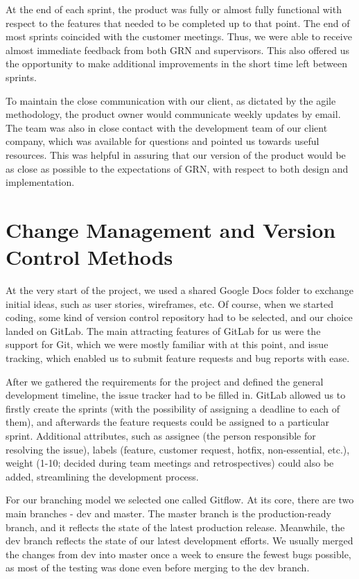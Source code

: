 \documentclass{l3proj}
\begin{document}
At the end of each sprint, the product was fully or almost fully
 functional with respect to the features that needed to be completed
 up to that point. The end of most sprints coincided with the customer
 meetings. Thus, we were able to receive almost immediate feedback
 from both GRN and supervisors. This also offered us the opportunity
 to make additional improvements in the short time left between sprints.

To maintain the close communication with our client, as dictated by
 the agile methodology, the product owner would communicate weekly
 updates by email. The team was also in close contact with the
 development team of our client company, which was available
 for questions and pointed us towards useful resources. This
 was helpful in assuring that our version of the product would
 be as close as possible to the expectations of GRN, with respect
 to both design and implementation.

\newpage
\section{Change Management and Version Control Methods}
\label{sec:changemgmt}

At the very start of the project, we used a shared Google Docs folder
 to exchange initial ideas, such as user stories, wireframes, etc.
 Of course, when we started coding, some kind of version control
 repository had to be selected, and our choice landed on GitLab.
 The main attracting features of GitLab for us were the support for
 Git, which we were mostly familiar with at this point, and issue
 tracking, which enabled us to submit feature requests and bug reports
 with ease.

After we gathered the requirements for the project and defined the general
 development timeline, the issue tracker had to be filled in. GitLab allowed
 us to firstly create the sprints (with the possibility of assigning a deadline
 to each of them), and afterwards the feature requests could be assigned to a
 particular sprint. Additional attributes, such as assignee (the person
 responsible for resolving the issue), labels (feature, customer request,
 hotfix, non-essential, etc.), weight (1-10; decided during team meetings
 and retrospectives) could also be added, streamlining the development process.

For our branching model we selected one called Gitflow\cite{gitflow}. At
 its core, there are two main branches - dev and master. The master branch
 is the production-ready branch, and it reflects the state of the latest
 production release. Meanwhile, the dev branch reflects the state of our
 latest development efforts. We usually merged the changes from dev into
 master once a week to ensure the fewest bugs possible, as most
 of the testing was done even before merging to the dev branch.
\end{document}
